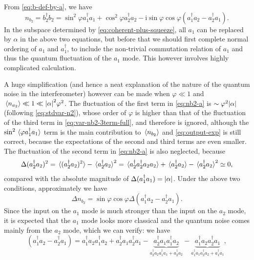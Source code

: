 \documentclass[hyperref, a4paper]{article}
\newcommand*{\ii}{\mathrm{i}}
\begin{document}
From \eqref{eq:b-def-by-a}, we have 
\begin{equation}
    n_{b_2} = b_2^\dagger b_2 = 
    \sin^2 \varphi a_1^\dagger a_1 + \cos^2 \varphi a_2^\dagger a_2
    - \ii \sin \varphi \cos \varphi (a_1^\dagger a_2 - a_2^\dagger a_1).
    \label{eq:nb2-a}
\end{equation}
In the subspace determined by \eqref{eq:coherent-plus-squeeze},
all $a_1$ can be replaced by $\alpha$ in the above two equations,
but before that we should first complete normal ordering of $a_1$ and $a_1^\dagger$,
to include the non-trivial commutation relation of $a_1$
and thus the quantum fluctuation of the $a_1$ mode.
This however involves highly complicated calculation.

A huge simplification 
(and hence a neat explanation of the nature of the quantum noise in the interferometer) 
however can be made when $\varphi \ll 1$ and $\expval*{n_{a_2}} \ll 1 \ll \abs{\alpha}^2 \varphi^2$.
The fluctuation of the first term in \eqref{eq:nb2-a} is $\sim \varphi^2 \abs{\alpha}$
(following \eqref{eq:stdvar-n2}),
whose order of $\varphi$ is higher than 
that of the fluctuation of the third term in \eqref{eq:var-nb2-3term-full},
and therefore is ignored,
although the $\sin^2 \expval*{ \varphi a_1^\dagger a_1}$ term 
is the main contribution to $\expval*{n_{b_2}}$
and \eqref{eq:output-exp} is still correct,
because the expectations of the second and third terms are even smaller. 
The fluctuation of the second term in \eqref{eq:nb2-a} is also neglected,
because 
\begin{equation}
    \Delta (a_2^\dagger a_2)^2 = \expval*{ (a_2^\dagger a_2)^2 } - \expval*{ a_2^\dagger a_2 }^2 = 
    \expval*{a_2^\dagger a_2^\dagger a_2 a_2} + \expval*{a_2^\dagger a_2} - \expval*{ a_2^\dagger a_2 }^2 \simeq 0,
\end{equation}
compared with the absolute magnitude of 
$\Delta (a_1^\dagger a_1) = \abs{\alpha}$.
Under the above two conditions, approximately we have 
\begin{equation}
    \Delta n_{b_2} = \sin \varphi \cos \varphi \Delta (a_1^\dagger a_2 - a_2^\dagger a_1 ) .
    \label{eq:var-nb2-3term-full}
\end{equation}
Since the input on the $a_1$ mode is much stronger than the input on the $a_2$ mode,
it is expected that the $a_1$ mode looks more classical and 
the quantum noise comes mainly from the $a_2$ mode,
which we can verify:
we have 
\[
    (a_1^\dagger a_2 - a_2^\dagger a_1)
    = a_1^\dagger a_2 a_1^\dagger a_2
    + a_2^\dagger a_1 a_2^\dagger a_1
    - \underbrace{a_2^\dagger a_1 a_1^\dagger a_2}_{a_2^\dagger a_2 a_1^\dagger a_1 + a_2^\dagger a_2}
    - \underbrace{a_1^\dagger a_2 a_2^\dagger a_1}_{a_1^\dagger a_1 a_2^\dagger a_2 + a_1^\dagger a_1},
\]
\end{document}
